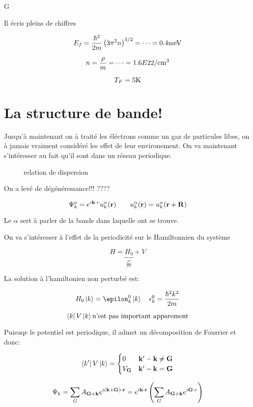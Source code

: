 G



Il écris pleins de chiffres 

$$E_{f} = \frac{\hbar^2}{2m}\left( 3\pi^2 n \right)^{3/2} = \dotsb = 0.4 {\rm meV}$$ 

$$n=\frac{\rho}{m} = \dotsb = 1.6E22/{\rm cm^3} $$ 

$$T_{F} = 5 {\rm K}$$ 



\section*{La structure de bande!}

Jusqu'à maintenant on à traité les éléctrons comme un gaz de particules libes, on à jamais vraiment considéré les effet de leur environement. On va maintenant s'intéresser au fait qu'il sont dans un réseau periodique.


\begin{figure}[ht]
    \centering
    \caption{relation de dispersion}
    \label{fig:relation-de-dispersion}
\end{figure}

On a levé de dégénéressance!!! ????


$$\Psi_{k}^a = e^{i\vb{k}\cdot r} u_{k}^\alpha(\vb{r})\qquad u_{k}^\alpha(\vb{r}) = u_{k}^\alpha(\vb{r} + \vb{R})$$ 

Le $\alpha$ sert à parler de la bande dans laquelle ont se trouve.

On va s'intéresser à l'effet de la periodicité sur le Hamiltonnien du système

$$H = \underbrace{H_{0}}_{\frac{p^2}{2m} } + V$$ 

La solution à l'hamiltonien non perturbé est:

$$H_{0} \ket{k} = \epilon_{k}^0 \ket{k}\quad \epsilon_{k}^0 = \frac{\hbar^2k^2}{2m} $$ 


$$\bra{k}V\ket{k} \text{n'est pas important apparement}$$ 


Puisuqe le potentiel est periodique, il admet un décomposition de Fourrier et donc:

$$\bra{k'}V\ket{k} = \begin{cases}
	0 & \vb{k}'-\vb{k} \neq \vb{G}\\
	V_{\vb{G}} & \vb{k}' - \vb{k} = \vb{G}
\end{cases}$$ 

$$\Psi_{k} = \sum_{G} A_{\vb{G}+\vb{k}} e^{i(\vb{k} + \vb{G}) \cdot \vb{r}} = e^{i\vb{k} \cdot \vb{r}} \left( \sum_{G} A_{\vb{G} + \vb{k}} e^{i \vb{G}\cdot r} \right) $$ 

